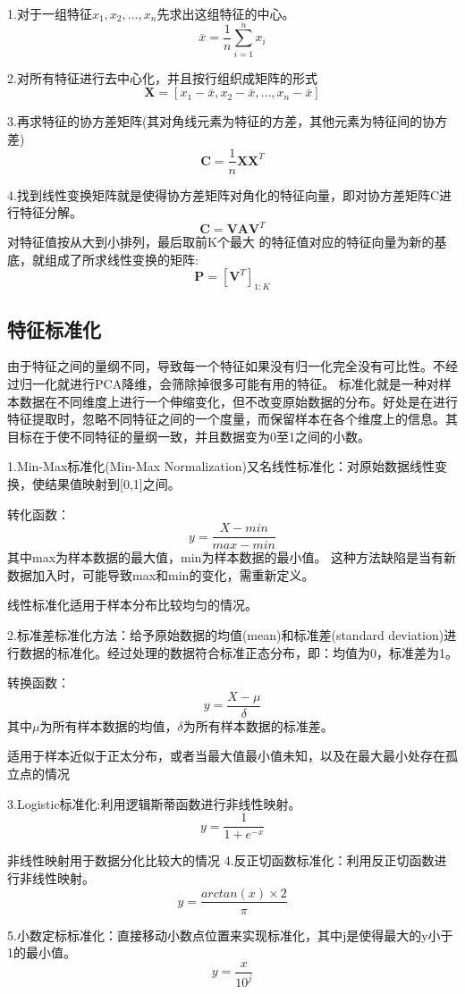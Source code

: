\documentclass[openbib]{article}
\begin{document}
1.对于一组特征${x_1,x_2,...,x_n}$先求出这组特征的中心。$$\bar{x}=\frac{1}{n}\sum_{i=1}^{n}x_i$$

2.对所有特征进行去中心化，并且按行组织成矩阵的形式$$\textbf{X}=[x_1-\bar{x},x_2-\bar{x},...,x_n-\bar{x}]$$

3.再求特征的协方差矩阵(其对角线元素为特征的方差，其他元素为特征间的协方差)$$\textbf{C}=\frac{1}{n}\textbf{X}\textbf{X}^T$$

4.找到线性变换矩阵就是使得协方差矩阵对角化的特征向量，即对协方差矩阵C进行特征分解。$$\textbf{C}=\textbf{VAV}^T$$
对特征值按从大到小排列，最后取前K个最大 的特征值对应的特征向量为新的基底，就组成了所求线性变换的矩阵:$$\textbf{P}=[\textbf{V}^T]_{1:K}$$

\subsection{特征标准化}
由于特征之间的量纲不同，导致每一个特征如果没有归一化完全没有可比性。不经过归一化就进行PCA降维，会筛除掉很多可能有用的特征。
标准化就是一种对样本数据在不同维度上进行一个伸缩变化，但不改变原始数据的分布。好处是在进行特征提取时，忽略不同特征之间的一个度量，而保留样本在各个维度上的信息。其目标在于使不同特征的量纲一致，并且数据变为0至1之间的小数。


1.Min-Max标准化(Min-Max Normalization)又名线性标准化：对原始数据线性变换，使结果值映射到[0,1]之间。

转化函数：
$$
y=\frac{X-min}{max-min}
$$
其中max为样本数据的最大值，min为样本数据的最小值。
这种方法缺陷是当有新数据加入时，可能导致max和min的变化，需重新定义。

线性标准化适用于样本分布比较均匀的情况。

2.标准差标准化方法：给予原始数据的均值(mean)和标准差(standard deviation)进行数据的标准化。经过处理的数据符合标准正态分布，即：均值为0，标准差为1。

转换函数：
$$
y=\frac{X-\mu}{\delta}
$$
其中$\mu$为所有样本数据的均值，$\delta$为所有样本数据的标准差。

适用于样本近似于正太分布，或者当最大值最小值未知，以及在最大最小处存在孤立点的情况

3.Logistic标准化:利用逻辑斯蒂函数进行非线性映射。
$$
y=\frac{1}{1+e^{-x}}
$$

非线性映射用于数据分化比较大的情况
4.反正切函数标准化：利用反正切函数进行非线性映射。
$$y=\frac{arctan(x)\times2}{\pi}$$

5.小数定标标准化：直接移动小数点位置来实现标准化，其中j是使得最大的y小于1的最小值。
$$y=\frac{x}{10^j}$$
\end{document}
